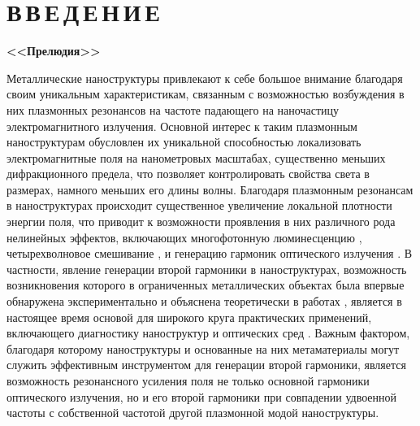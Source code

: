 \documentclass[12pt, a4paper]{article}
\begin{document}
\section*{В\,В\,Е\,Д\,Е\,Н\,И\,Е}

\bf{<<Прелюдия>>}\rm

Металлические наноструктуры привлекают к себе большое внимание благодаря своим уникальным характеристикам, связанным с возможностью возбуждения в них плазмонных резонансов на частоте падающего на наночастицу электромагнитного излучения.
Основной интерес к таким плазмонным наноструктурам обусловлен их уникальной способностью локализовать электромагнитные поля на нанометровых масштабах, существенно меньших дифракционного предела, что позволяет контролировать свойства света в размерах, намного меньших его длины волны\cite{Mai2007, Gram2010}.
Благодаря плазмонным резонансам в наноструктурах происходит существенное увеличение локальной плотности энергии поля, что приводит к возможности проявления в них различного рода нелинейных эффектов, включающих многофотонную люминесценцию \cite{Cas2011,biagioni2012,chen2021, ko2011}, четырехволновое смешивание \cite{danckwerts2007, harutyunyan2012, paspalakis2014, singh2016}, и генерацию гармоник оптического излучения \cite{drobyh2020, smirnova2014, TorresTorres2010}.
В частности, явление генерации второй гармоники в наноструктурах, возможность возникновения которого в ограниченных металлических объектах была впервые обнаружена экспериментально и объяснена теоретически в работах \cite{franken1961, Bloembergen1962}, является в настоящее время основой для широкого круга практических применений, включающего диагностику наноструктур \cite{butet2015} и оптических сред \cite{Butet2012}.
Важным фактором, благодаря которому наноструктуры и основанные на них метаматериалы могут служить эффективным инструментом для генерации второй гармоники, является возможность резонансного усиления поля не только основной гармоники оптического излучения, но и его второй гармоники при совпадении удвоенной частоты с собственной частотой другой плазмонной модой наноструктуры. 
\end{document}
